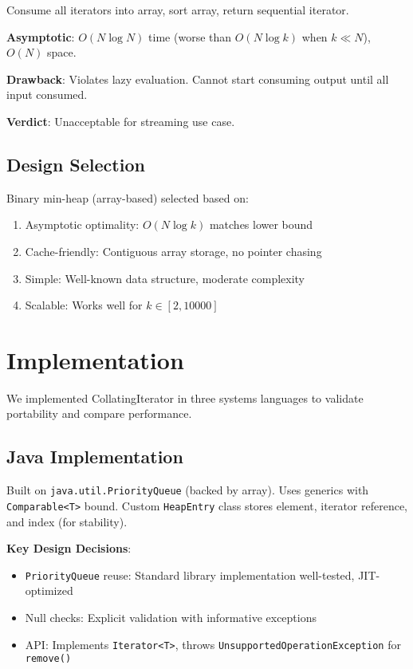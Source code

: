\documentclass[11pt]{article}
\begin{document}
Consume all iterators into array, sort array, return sequential iterator.

\textbf{Asymptotic}: $O(N \log N)$ time (worse than $O(N \log k)$ when $k \ll N$), $O(N)$ space.

\textbf{Drawback}: Violates lazy evaluation. Cannot start consuming output until all input consumed.

\textbf{Verdict}: Unacceptable for streaming use case.

\subsection{Design Selection}

Binary min-heap (array-based) selected based on:
\begin{enumerate}
    \item Asymptotic optimality: $O(N \log k)$ matches lower bound
    \item Cache-friendly: Contiguous array storage, no pointer chasing
    \item Simple: Well-known data structure, moderate complexity
    \item Scalable: Works well for $k \in [2, 10000]$
\end{enumerate}

\section{Implementation}

We implemented CollatingIterator in three systems languages to validate portability and compare performance.

\subsection{Java Implementation}

Built on \texttt{java.util.PriorityQueue} (backed by array). Uses generics with \texttt{Comparable<T>} bound. Custom \texttt{HeapEntry} class stores element, iterator reference, and index (for stability).

\textbf{Key Design Decisions}:
\begin{itemize}
    \item \texttt{PriorityQueue} reuse: Standard library implementation well-tested, JIT-optimized
    \item Null checks: Explicit validation with informative exceptions
    \item API: Implements \texttt{Iterator<T>}, throws \texttt{UnsupportedOperationException} for \texttt{remove()}
\end{itemize}
\end{document}
